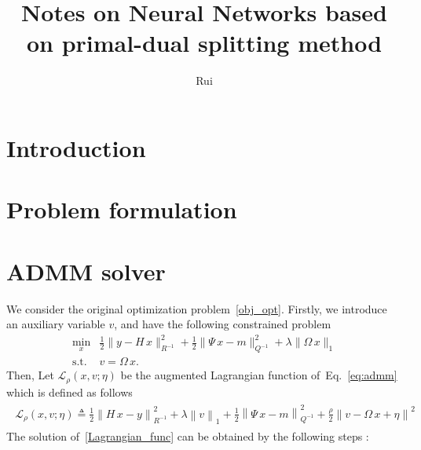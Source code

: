 \documentclass[11pt,a4paper]{article}
\title{Notes on Neural Networks based on primal-dual splitting method }
\author{Rui}
\begin{document}
\maketitle

\tableofcontents
\section{Introduction}

\section{Problem formulation}



\section{ADMM solver}
We consider the original optimization problem~\eqref{obj_opt}. Firstly, we introduce an auxiliary variable $v$, and have the following constrained problem  
\begin{equation}\label{eq:admm}
\begin{split}
\min_{x} &\frac{1}{2} \| y - H \, x \|^2_{R^{-1}}
   + \frac{1}{2} \| \Psi \, x - m \|^2_{Q^{-1}} 
   + \lambda \|\Omega\, x \|_1  \\
\mathrm{s.t.}\ & v = \Omega\,x . 
\end{split}
\end{equation}
Then, Let $\mathcal{L_\rho}(x,v;\eta)$ be the augmented Lagrangian function of~Eq.~\eqref{eq:admm} which is defined as follows
\begin{equation}\label{Lagrangian_func}
\begin{split}
\begin{aligned}
\mathcal{L_\rho}(x,v;\eta) \triangleq  \frac{1}{2}  \left \|  H\,x-y \right \|_{R^{-1}}^2 + \lambda\left \| v \right \|_1 
+ \frac{1}{2} \left \| \Psi \, x - m\right\|_{ Q^{-1} }^2    
+ \frac{\rho}{2}\left \| v- \Omega \,x + \eta \right \|^2
\end{aligned}
\end{split}
\end{equation}
The solution of~\eqref{Lagrangian_func} can be obtained by the following steps \cite{Boyd2011ADMM}:
\end{document}
